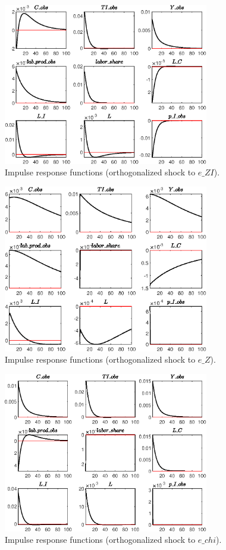  
\begin{figure}[H]
\centering 
\includegraphics[width=0.80\textwidth]{two_sector_RBC_mobile/graphs/two_sector_RBC_mobile_IRF_e_ZI}
\caption{Impulse response functions (orthogonalized shock to $e\_ZI$).}
\label{Fig:IRF:e_ZI}
\end{figure}
 
\begin{figure}[H]
\centering 
\includegraphics[width=0.80\textwidth]{two_sector_RBC_mobile/graphs/two_sector_RBC_mobile_IRF_e_Z}
\caption{Impulse response functions (orthogonalized shock to $e\_Z$).}
\label{Fig:IRF:e_Z}
\end{figure}
 
\begin{figure}[H]
\centering 
\includegraphics[width=0.80\textwidth]{two_sector_RBC_mobile/graphs/two_sector_RBC_mobile_IRF_e_chi}
\caption{Impulse response functions (orthogonalized shock to $e\_chi$).}
\label{Fig:IRF:e_chi}
\end{figure}
 
 
